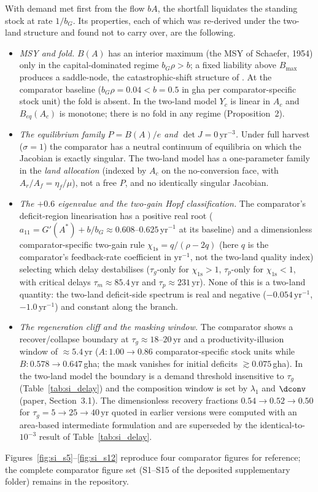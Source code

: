 With demand met first from the flow $bA$, the shortfall liquidates the standing stock at rate $1/b_G$. Its properties, each of which was re-derived under the two-land structure and found not to carry over, are the following.
\begin{itemize}[leftmargin=1.5em]
\item \emph{MSY and fold.} $B(A)$ has an interior maximum (the MSY of Schaefer, 1954) only in the capital-dominated regime $b_G\rho>b$; a fixed liability above $B_{\max}$ produces a saddle-node, the catastrophic-shift structure of \citet{Scheffer2001}. At the comparator baseline ($b_G\rho=0.04<b=0.5$ in gha per comparator-specific stock unit) the fold is absent. In the two-land model $Y_c$ is linear in $A_c$ and $B_{eq}(A_c)$ is monotone; there is no fold in any regime (Proposition~2).
\item \emph{The equilibrium family $P=B(A)/e$ and $\det J=0\,\mathrm{yr}^{-3}$.} Under full harvest ($\sigma=1$) the comparator has a neutral continuum of equilibria on which the Jacobian is exactly singular. The two-land model has a one-parameter family in the \emph{land allocation} (indexed by $A_c$ on the no-conversion face, with $A_r/A_f=\eta_f/\mu$), not a free $P$, and no identically singular Jacobian.
\item \emph{The $+0.6$ eigenvalue and the two-gain Hopf classification.} The comparator's deficit-region linearisation has a positive real root ($a_{11}=G'(A^*)+b/b_G\approx0.608$--$0.625$\,yr$^{-1}$ at its baseline) and a dimensionless comparator-specific two-gain rule $\chi_{\mathrm{1s}}=q/(\rho-2q)$ (here $q$ is the comparator's feedback-rate coefficient in yr$^{-1}$, not the two-land quality index) selecting which delay destabilises ($\tau_g$-only for $\chi_{\mathrm{1s}}>1$, $\tau_p$-only for $\chi_{\mathrm{1s}}<1$, with critical delays $\tau_m\approx85.4$\,yr and $\tau_p\approx231$\,yr). None of this is a two-land quantity: the two-land deficit-side spectrum is real and negative ($-0.054\,\mathrm{yr}^{-1}$, $-1.0\,\mathrm{yr}^{-1}$) and constant along the branch.
\item \emph{The regeneration cliff and the masking window.} The comparator shows a recover/collapse boundary at $\tau_g\approx18$--$20$\,yr and a productivity-illusion window of $\approx5.4$\,yr ($A:1.00\to0.86$ comparator-specific stock units while $B:0.578\to0.647$\,gha; the mask vanishes for initial deficits $\gtrsim0.075$\,gha). In the two-land model the boundary is a demand threshold insensitive to $\tau_g$ (Table~\ref{tab:si_delay}) and the composition window is set by $\lambda_1$ and $\dconv$ (paper, Section~3.1). The dimensionless recovery fractions $0.54\to0.52\to0.50$ for $\tau_g=5\to25\to40$\,yr quoted in earlier versions were computed with an area-based intermediate formulation and are superseded by the identical-to-$10^{-3}$ result of Table~\ref{tab:si_delay}.
\end{itemize}
Figures~\ref{fig:si_s5}--\ref{fig:si_s12} reproduce four comparator figures for reference; the complete comparator figure set (S1--S15 of the deposited supplementary folder) remains in the repository.

